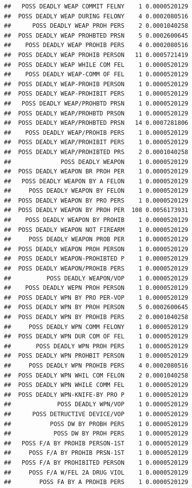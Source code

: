 \documentclass[]{book}
\begin{document}
\begin{verbatim}
##   POSS DEADLY WEAP COMMIT FELNY    1 0.0000520129
##  POSS DEADLY WEAP DURING FELONY    4 0.0002080516
##      POSS DEADLY WEAP PROH PERS    2 0.0001040258
##  POSS DEADLY WEAP PROHBTED PRSN    5 0.0002600645
##    POSS DEADLY WEAP PROHIB PERS    4 0.0002080516
##  POSS DEADLY WEAP PROHIB PERSON   11 0.0005721419
##  POSS DEADLY WEAP WHILE COM FEL    1 0.0000520129
##    POSS DEADLY WEAP-COMM OF FEL    1 0.0000520129
##  POSS DEADLY WEAP-PROHIB PERSON    1 0.0000520129
##  POSS DEADLY WEAP-PROHIBIT PERS    1 0.0000520129
##   POSS DEADLY WEAP/PROHBTD PRSN    1 0.0000520129
##  POSS DEADLY WEAP/PROHBTD PRSON    1 0.0000520129
##  POSS DEADLY WEAP/PROHBTED PRSN   14 0.0007281806
##    POSS DEADLY WEAP/PROHIB PERS    1 0.0000520129
##  POSS DEADLY WEAP/PROHIBIT PERS    1 0.0000520129
##  POSS DEADLY WEAP/PROHIBTED PRS    2 0.0001040258
##              POSS DEADLY WEAPON    1 0.0000520129
##  POSS DEADLY WEAPON BR PROH PER    1 0.0000520129
##   POSS DEADLY WEAPON BY A FELON    1 0.0000520129
##     POSS DEADLY WEAPON BY FELON    1 0.0000520129
##  POSS DEADLY WEAPON BY PRO PERS    1 0.0000520129
##  POSS DEADLY WEAPON BY PROH PER  108 0.0056173931
##    POSS DEADLY WEAPON BY PROHIB    1 0.0000520129
##  POSS DEADLY WEAPON NOT FIREARM    1 0.0000520129
##     POSS DEADLY WEAPON PROB PER    1 0.0000520129
##  POSS DEADLY WEAPON PROH PERSON    1 0.0000520129
##  POSS DEADLY WEAPON-PROHIBTED P    1 0.0000520129
##  POSS DEADLY WEAPON/PROHIB PERS    1 0.0000520129
##          POSS DEADLY WEAPON/VOP    1 0.0000520129
##    POSS DEADLY WEPN PROH PERSON    1 0.0000520129
##  POSS DEADLY WPN BY PRO PER-VOP    1 0.0000520129
##  POSS DEADLY WPN BY PROH PERSON    5 0.0002600645
##  POSS DEADLY WPN BY PROHIB PERS    2 0.0001040258
##     POSS DEADLY WPN COMM FELONY    1 0.0000520129
##  POSS DEADLY WPN DUR COM OF FEL    1 0.0000520129
##       POSS DEADLY WPN PROH PERS    1 0.0000520129
##  POSS DEADLY WPN PROHBIT PERSON    1 0.0000520129
##     POSS DEADLY WPN PROHIB PERS    4 0.0002080516
##  POSS DEADLY WPN WHIL COM FELON    2 0.0001040258
##  POSS DEADLY WPN WHILE COMM FEL    1 0.0000520129
##  POSS DEADLY WPN-KNIFE-BY PRO P    1 0.0000520129
##             POSS DEADLY WPN/VOP    1 0.0000520129
##      POSS DETRUCTIVE DEVICE/VOP    1 0.0000520129
##           POSS DW BY PROBH PERS    1 0.0000520129
##            POSS DW BY PROH PERS    1 0.0000520129
##   POSS F/A BY PROHIB PERSON-1ST    1 0.0000520129
##     POSS F/A BY PROHIB PRSN-1ST    1 0.0000520129
##   POSS F/A BY PROHIBITED PERSON    1 0.0000520129
##     POSS F/A W/FEL 2A DRUG VIOL    1 0.0000520129
##        POSS FA BY A PROHIB PERS    1 0.0000520129

\end{verbatim}
\end{document}
